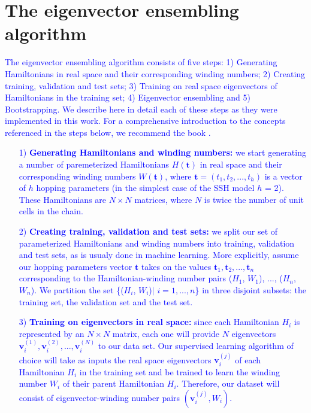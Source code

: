 \documentclass[10pt]{revtex4-1}
\newcommand{\citequote}[1]{\ref{#1}}
\begin{document}
\section{The eigenvector ensembling algorithm}%
\label{the_eigenvector_ensembling_algorithm}
\textcolor{blue}{
The eigenvector ensembling algorithm consists of five steps: 1) Generating Hamiltonians in real space and their corresponding winding numbers; 2) Creating training, validation and test sets; 3) Training on real space eigenvectors of Hamiltonians in the training set; 4) Eigenvector ensembling and 5) Bootstrapping. We describe here in detail each of these steps as they were implemented in this work. For a comprehensive introduction to the concepts referenced in the steps below, we recommend the book \cite{friedman2001elements}.    
\vspace{.3cm}
\begin{enumerate}%
\item[1)] \textbf{Generating Hamiltonians and winding numbers:} we start generating a number of paremeterized Hamiltonians $H(\mathbf{t})$ in real space and their corresponding winding numbers $W(\mathbf{t})$, where $\mathbf{t} = (t_1, t_2,...,t_h)$ is a vector of $h$ hopping parameters (in the simplest case of the SSH model $h$ = 2). These Hamiltonians are $N\times N$ matrices, where $N$ is twice the number of unit cells in the chain.
\item[2)] \textbf{Creating training, validation and test sets:} we split our set of parameterized Hamiltonians and winding numbers into training, validation and test sets, as is usualy done in machine learning. More explicitly, assume our hopping parameters vector $\mathbf{t}$ takes on the values $\mathbf{t}_1, \mathbf{t}_2, ..., \mathbf{t}_n$ corresponding to the Hamiltonian-winding number pairs ($H_1$, $W_1$), ..., ($H_n$, $W_n$). We partition the set \{($H_i$, $W_i$)$\mid$ $i=1,...,n$\} in three disjoint subsets: the training set, the validation set and the test set.
\item[3)] \textbf{Training on eigenvectors in real space:} since each Hamiltonian $H_i$ is represented by an $N\times N$ matrix, each one will provide $N$ eigenvectors $\mathbf{v}_i^{(1)}, \mathbf{v}_i^{(2)},...,\mathbf{v}_i^{(N)}$ to our data set. Our supervised learning algorithm of choice will take as inputs the real space eigenvectors $\mathbf{v}^{(j)}_i$ of each Hamiltonian $H_i$ in the training set and be trained to learn the winding number $W_i$ of their parent Hamiltonian $H_i$. Therefore, our dataset will consist of eigenvector-winding number pairs $(\mathbf{v}_i^{(j)}, W_i)$.

\end{enumerate}}
\end{document}
